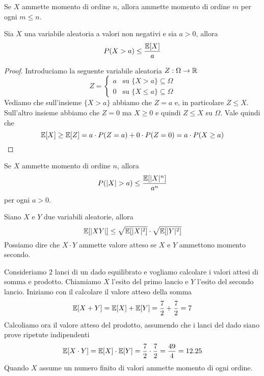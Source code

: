 \begin{proposition}
	Se $X$ ammette momento di ordine $n$, allora ammette momento di ordine $m$ per ogni $m \leq n$.
\end{proposition}

\begin{proposition}\label{prop: markov}
	Sia $X$ una variabile aleatoria a valori non negativi e sia $a>0$, allora
	\[ P(X > a) \leq \frac{\mathbb{E}[X]}{a} \]
	\begin{proof}
		Introduciamo la seguente variabile aleatoria $Z : \Omega \to \mathbb{R}$
		\[
			Z = \begin{cases}
				a & \text{su } \{ X > a \} \subseteq \Omega    \\
				0 & \text{su } \{ X \leq a \} \subseteq \Omega
			\end{cases}
		\]
		Vediamo che sull'insieme $\{ X > a \}$ abbiamo che $Z = a$ e, in particolare $Z \leq X$.
		Sull'altro insieme abbiamo che $Z = 0$ ma $X \geq 0$ e quindi $Z \leq X$ su $\Omega$.
		Vale quindi che
		\[ \mathbb{E}[X] \geq \mathbb{E}[Z] = a \cdot P(Z = a) + 0 \cdot P(Z = 0) = a \cdot P(X \geq a) \]
	\end{proof}
\end{proposition}

\begin{corollary}
	Se $X$ ammette momento di ordine $n$, allora
	\[ P(|X| > a) \leq \frac{\mathbb{E}[|X|^n]}{a^n} \]
	per ogni $a > 0$.
\end{corollary}

\begin{proposition}
	Siano $X$ e $Y$ due variabili aleatorie, allora
	\[ \mathbb{E}[|XY|] \leq \sqrt{\mathbb{E}[|X|^2]} \cdot \sqrt{\mathbb{E}[|Y|^2]} \]
	Possiamo dire che $X \cdot Y$ ammette valore atteso se $X$ e $Y$ ammettono momento secondo.
\end{proposition}

\begin{example}
	Consideriamo 2 lanci di un dado equilibrato e vogliamo calcolare i valori attesi di somma e
	prodotto. Chiamiamo $X$ l'esito del primo lancio e $Y$ l'esito del secondo lancio. Iniziamo
	con il calcolare il valore atteso della somma
	\[ \mathbb{E}[X + Y] = \mathbb{E}[X] + \mathbb{E}[Y] = \frac{7}{2} + \frac{7}{2} = 7 \]
	Calcoliamo ora il valore atteso del prodotto, assumendo che i lanci del dado siano prove
	ripetute indipendenti
	\[ \mathbb{E}[X \cdot Y] = \mathbb{E}[X] \cdot \mathbb{E}[Y] = \frac{7}{2} \cdot \frac{7}{2} = \frac{49}{4} = 12.25 \]
	Quando $X$ assume un numero finito di valori ammette momento di ogni ordine.
\end{example}

